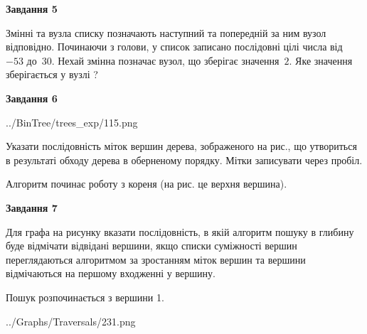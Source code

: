 \documentclass[12pt, ukrainian]{article}
\begin{document}
{\begin {large}
{\begin {center}\textbf{Завдання 5}\end {center}}\par
Змінні  та  вузла списку позначають наступний та попередній за ним вузол відповідно. Починаючи з голови, у список записано послідовні цілі числа від~$-53$ до~$30$. Нехай змінна  позначає вузол, що зберігає значення~$2$.
Яке значення зберігається у вузлі  ?\par
\newpage

{\begin {center}\textbf{Завдання 6}\end {center}}\par

\begin{center}
	{../BinTree/trees_exp/115.png}
\end{center}
Указати послідовність міток вершин дерева, зображеного на рис., що утвориться в результаті обходу дерева в оберненому порядку. Мітки записувати через пробіл.\par Алгоритм починає роботу з кореня (на рис. це верхня вершина).\par
\newpage

{\begin {center}\textbf{Завдання 7}\end {center}}\par
Для графа на рисунку вказати послідовність, в якій алгоритм пошуку в глибину буде відмічати відвідані вершини, якщо списки суміжності вершин переглядаються алгоритмом за зростанням міток вершин та вершини відмічаються на першому вход\-женні у вершину.\par
Пошук розпочинається з вершини 1.\par

\begin{center}
	{../Graphs/Traversals/231.png}
\end{center}\par
\newpage


\end{large}}
\end{document}

